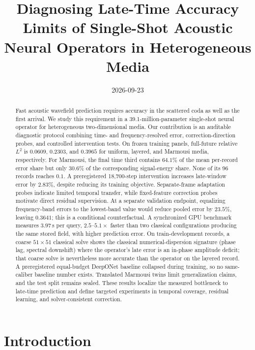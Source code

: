\documentclass[11pt,a4paper]{article}
\title{Diagnosing Late-Time Accuracy Limits of Single-Shot Acoustic Neural Operators in Heterogeneous Media}
\author{}
\date{2026-09-23}
\begin{document}
\maketitle

\begin{abstract}
Fast acoustic wavefield prediction requires accuracy in the scattered coda as well as the
first arrival. We study this requirement in a 39.1-million-parameter single-shot neural
operator for heterogeneous two-dimensional media. Our contribution is an auditable diagnostic
protocol combining time- and frequency-resolved error, correction-direction probes, and
controlled intervention tests. On frozen training panels, full-future relative $L^2$ is
$0.0609$, $0.2303$, and $0.3965$ for uniform, layered, and Marmousi media, respectively.
For Marmousi, the final time third contains $64.1\%$ of the mean per-record error share but
only $30.6\%$ of the corresponding signal-energy share. None of its 96 records reaches
$0.1$. A preregistered 18,700-step intervention increases late-window error by $2.83\%$,
despite reducing its training objective. Separate-frame adaptation probes indicate limited
temporal transfer, while fixed-feature correction probes motivate direct residual supervision.
At a separate validation endpoint, equalizing frequency-band errors to the lowest-band value
would reduce pooled error by $23.5\%$, leaving $0.3641$; this is a conditional counterfactual.
A synchronized GPU benchmark measures $3.97$\,s per query, $2.5$--$5.1\times$ faster than two
classical configurations producing the same stored field, with higher prediction error.
On train-development records, a coarse $51\times51$ classical solve shows the classical
numerical-dispersion signature (phase lag, spectral downshift) where the operator's late error
is an in-phase amplitude deficit; that coarse solve is nevertheless more accurate than the
operator on the layered record. A preregistered equal-budget DeepONet baseline collapsed
during training, so no same-caliber baseline number exists.
Translated Marmousi twins limit generalization claims, and the test split remains sealed.
These results localize the measured bottleneck to late-time prediction and define targeted
experiments in temporal coverage, residual learning, and solver-consistent correction.
\end{abstract}

\section{Introduction}
\end{document}
